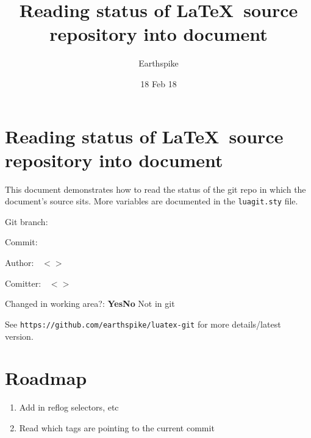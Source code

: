 \documentclass[a4paper]{article}
\title{Reading status of \LaTeX\ source repository into document}
\author{Earthspike}
\date{18 Feb 18}
\begin{document}
\begin{titlepage}
\maketitle
\end{titlepage}


\section{Reading status of \LaTeX\ source repository into document}

This document demonstrates how to read the status of the git repo in
which the document's source sits. More variables are documented in the
\verb|luagit.sty| file.

{\parindent0pt
\ifingit Git branch: {\bf\gitbranch}\par
Commit: {\bf\gitcommithash}\par
Author: {\bf\gitcommitauthorname\ $<$\gitcommitauthoremail$>$} {\bf\gitcommitauthordate}\par
Comitter: {\bf\gitcommitcommittername\ $<$\gitcommitcommitteremail$>$} {\bf\gitcommitcommitterdate}\par
Changed in working area?: {\bf\ifchangedsincegitcommit Yes\else No\fi}
\else
Not in git
\fi\par
}

See \verb|https://github.com/earthspike/luatex-git| for more details/latest version.

\section{Roadmap}

\begin{enumerate}
\item Add in reflog selectors, etc
  
\item Read which tags are pointing to the current commit
  
\end{enumerate}
\end{document}
